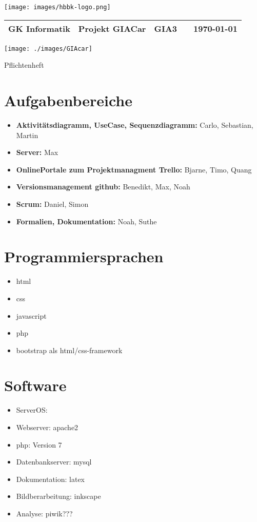 \documentclass[11pt,a4paper]{scrbook}
\begin{document}
\raggedleft\texttt{[image: images/hbbk-logo.png]}
\\
\begin{tabular}{p{4cm} p{5cm} p{1.5cm} p{1.5cm} p{3cm}}
  \tabularnewline
  \textbf{GK Informatik} & \textbf{Projekt GIACar}    & GIA3    &  & {\today} \tabularnewline 
  \hline
\end{tabular}


\centering
\texttt{[image: ./images/GIAcar]}

\centering\Huge{Pflichtenheft} \\

\normalsize
\section*{Aufgabenbereiche}
	\begin{itemize}
	\item \textbf{Aktivitätsdiagramm, UseCase, Sequenzdiagramm:} Carlo, Sebastian, Martin
	\item \textbf{Server:} Max
	\item \textbf{OnlinePortale zum Projektmanagment Trello:} Bjarne, Timo, Quang
	\item \textbf{Versionsmanagement github:} Benedikt, Max, Noah
	\item \textbf{Scrum:} Daniel, Simon
	\item \textbf{Formalien, Dokumentation:} Noah, Suthe
	\end{itemize}
\section*{Programmiersprachen}
\begin{itemize}
\item html
\item css
\item javascript
\item php
\item bootstrap als html/css-framework
\end{itemize}
\section*{Software}
\begin{itemize}
\item ServerOS: 
\item Webserver: apache2
\item php: Version 7
\item Datenbankserver: mysql
\item Dokumentation: latex
\item Bildberarbeitung: inkscape 
\item Analyse: piwik???
\end{itemize}
\end{document}
